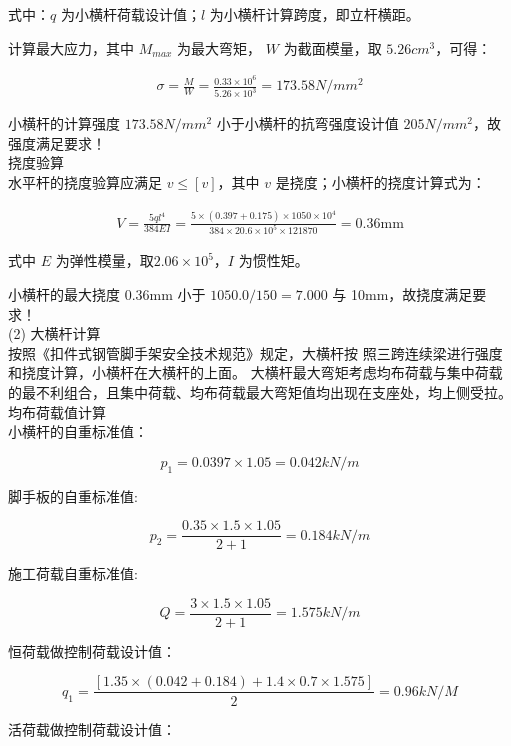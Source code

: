 式中：$q$ 为小横杆荷载设计值；$l$ 为小横杆计算跨度，即立杆横距。

计算最大应力，其中 $M_{max}$ 为最大弯矩， $W$ 为截面模量，取 $5.26 cm^3$，可得：

\begin{align}
    \label{fx:load}
    \sigma =\frac{M}{W}=\frac{0.33\times 10^6}{5.26\times10^3}=173.58N/mm^2
\end{align}

小横杆的计算强度 $173.58N/mm^2$ 小于小横杆的抗弯强度设计值 $205N/mm^2$，故强度满足要求！\\

 挠度验算\\

水平杆的挠度验算应满足 $v\leq [v] $，其中 $v$ 是挠度；小横杆的挠度计算式为：

\begin{align}
    V=\frac{5ql^4}{384EI}=\frac{5\times (0.397+0.175)\times 1050\times 10^4}{384\times 20.6\times 10^5\times 121870}=0.36 \text{mm}
\end{align}

式中 $E$ 为弹性模量，取$2.06\times 10^5$，$I$ 为惯性矩。

小横杆的最大挠度 0.36mm 小于 $1050.0/150=7.000$ 与 10mm，故挠度满足要求！ \\

(2) 大横杆计算\\

按照《扣件式钢管脚手架安全技术规范》规定，大横杆按
照三跨连续梁进行强度和挠度计算，小横杆在大横杆的上面。
大横杆最大弯矩考虑均布荷载与集中荷载的最不利组合，且集中荷载、均布荷载最大弯矩值均出现在支座处，均上侧受拉。\\

 均布荷载值计算\\

小横杆的自重标准值：

$$p_1=0.0397 \times 1.05=0.042 kN/m$$

脚手板的自重标准值:

$$p_2=\frac{0.35 \times 1.5\times 1.05}{2+1}=0.184 kN/m$$

施工荷载自重标准值:

$$Q=\frac{3 \times 1.5\times 1.05}{2+1}=1.575 kN/m$$

恒荷载做控制荷载设计值：

$$q_1=\frac{[1.35\times(0.042+0.184)+1.4\times 0.7\times 1.575]}{2}=0.96 kN/M$$

活荷载做控制荷载设计值：

